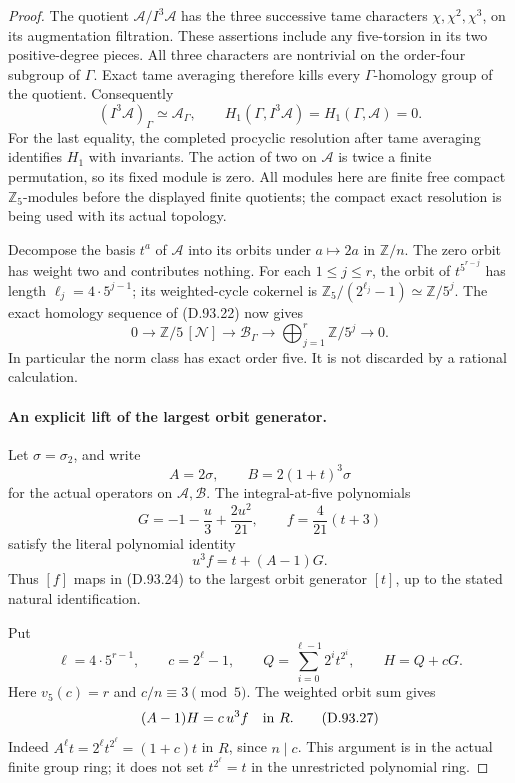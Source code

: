 \begin{proof}
The quotient \(\mathscr A/I^3\mathscr A\) has the three
successive tame characters \(\chi,\chi^2,\chi^3\), on its
augmentation filtration. These assertions include any
five-torsion in its two positive-degree pieces. All three
characters are nontrivial on the order-four subgroup of
\(\Gamma\). Exact tame averaging therefore kills every
\(\Gamma\)-homology group of the quotient. Consequently
\[
 (I^3\mathscr A)_\Gamma\simeq\mathscr A_\Gamma,
 \qquad H_1(\Gamma,I^3\mathscr A)=H_1(\Gamma,\mathscr A)=0.
                                                               \tag{D.93.23}
\]
For the last equality, the completed procyclic resolution
after tame averaging identifies \(H_1\) with invariants.
The action of two on \(\mathscr A\) is twice a finite
permutation, so its fixed module is zero. All modules here
are finite free compact \(\mathbb Z_5\)-modules before the
displayed finite quotients; the compact exact resolution is
being used with its actual topology.

Decompose the basis \(t^a\) of \(\mathscr A\) into its orbits
under \(a\mapsto2a\) in \(\mathbb Z/n\).
The zero orbit has weight two and contributes nothing.
For each \(1\le j\le r\), the orbit of
\(t^{5^{r-j}}\) has length \(\ell_j=4\cdot5^{j-1}\);
its weighted-cycle cokernel is
\(\mathbb Z_5/(2^{\ell_j}-1)\simeq\mathbb Z/5^j\).
The exact homology sequence of (D.93.22) now gives
\[
 0\longrightarrow\mathbb Z/5\,[\mathcal N]
 \longrightarrow\mathscr B_\Gamma
 \longrightarrow\bigoplus_{j=1}^r\mathbb Z/5^j
 \longrightarrow0.                                  \tag{D.93.24}
\]
In particular the norm class has exact order five. It is
not discarded by a rational calculation.

\paragraph{An explicit lift of the largest orbit generator.}
Let \(\sigma=\sigma_2\), and write
\[
 A=2\sigma,\qquad B=2(1+t)^3\sigma
\]
for the actual operators on \(\mathscr A,\mathscr B\).
The integral-at-five polynomials
\[
 G=-1-\frac{u}{3}+\frac{2u^2}{21},
       \qquad f=\frac4{21}(t+3)
\]
satisfy the literal polynomial identity
\[
                 u^3 f=t+(A-1)G.                     \tag{D.93.25}
\]
Thus \([f]\) maps in (D.93.24) to the largest orbit
generator \([t]\), up to the stated natural identification.

Put
\[
 \ell=4\cdot5^{r-1},\qquad
 c=2^\ell-1,\qquad
 Q=\sum_{i=0}^{\ell-1}2^i t^{2^i},\qquad H=Q+cG .
                                                               \tag{D.93.26}
\]
Here \(v_5(c)=r\) and \(c/n\equiv3\pmod5\).
The weighted orbit sum gives
\[
                       (A-1)H=c\,u^3f
                          \quad\hbox{in }R.           \tag{D.93.27}
\]
Indeed \(A^\ell t=2^\ell t^{2^\ell}=(1+c)t\) in
\(R\), since \(n\mid c\). This argument is in the actual
finite group ring; it does not set \(t^{2^\ell}=t\)
in the unrestricted polynomial ring.


\end{proof}
